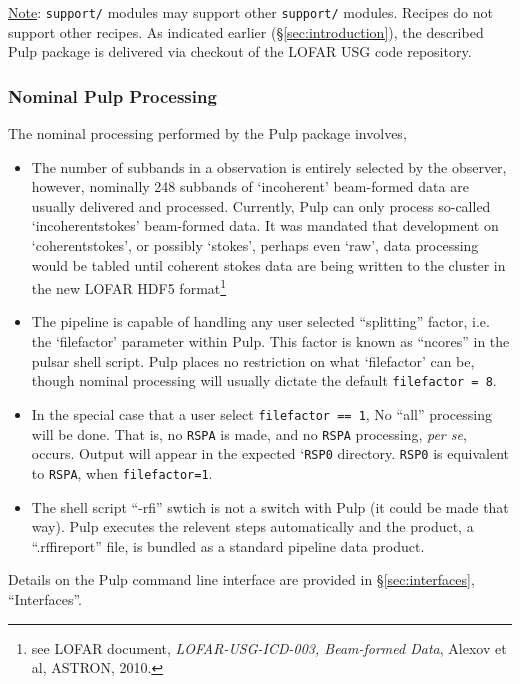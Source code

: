 \documentclass[a4paper,10pt,bibtotoc]{scrartcl}
\begin{document}
\underline{Note}: \verb|support/| modules may support other \verb|support/| modules. Recipes do not support other recipes.
\newline
As indicated earlier (\S \ref{sec:introduction}), the described Pulp package is delivered 
via checkout of the LOFAR USG code repository.

\subsubsection{Nominal Pulp Processing}
The nominal processing performed by the Pulp package involves,
\begin{itemize}
\item The number of subbands in a observation is entirely selected by the observer,
however, nominally 248 subbands of `incoherent' beam-formed data are
usually delivered and processed.  Currently, Pulp can only process
so-called  `incoherentstokes' beam-formed data.  It was mandated that
development on `coherentstokes', or possibly `stokes', perhaps even
`raw', data processing would be tabled until coherent stokes data are
being written to the cluster in the new LOFAR HDF5
format\footnote{see LOFAR document, \textit{LOFAR-USG-ICD-003,
    Beam-formed Data}, Alexov et al, ASTRON, 2010.}
\item The pipeline is capable of handling any user selected ``splitting'' factor, i.e. the 
`filefactor' parameter within Pulp.  This factor is known as ``ncores'' in the pulsar
shell script.  Pulp places no restriction on what `filefactor' can be, though nominal
processing will usually dictate the default \verb|filefactor = 8|.
\item In the special case that a user select \verb|filefactor == 1|,
  No ``all'' processing will be done.  That is, no \verb|RSPA| is
  made, and no \verb|RSPA| processing, \emph{per se}, occurs.  Output will appear in the
  expected `\verb|RSP0| directory. \verb|RSP0| is equivalent to
  \verb|RSPA|, when \verb|filefactor=1|.
\item The shell script ``-rfi'' swtich is not a switch with Pulp (it
  could be made that way).  Pulp executes the relevent steps
  automatically and the product, a ``.rffireport'' file, is bundled as
  a standard pipeline data product.
\end{itemize}
Details on the Pulp command line interface are provided in
\S\ref{sec:interfaces}, ``Interfaces''.
\end{document}
